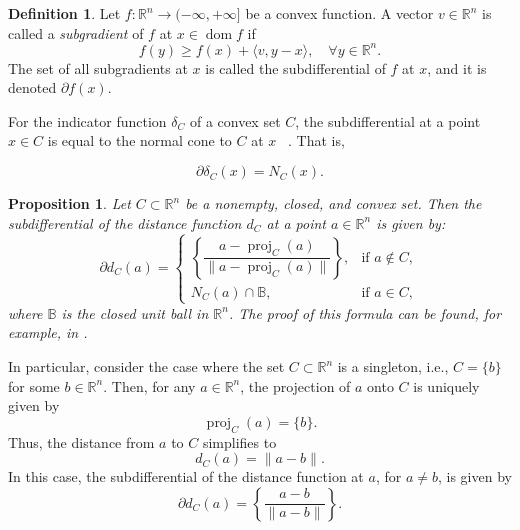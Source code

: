 \documentclass[12pt]{article}
\theoremstyle{plain}
\newtheorem{proposition}[theorem]{Proposition}
\theoremstyle{definition}
\newtheorem{definition}[theorem]{Definition}
\begin{document}
\begin{definition} Let $f : \mathbb{R}^n \to (-\infty, +\infty]$ be a convex function. A vector $v \in \mathbb{R}^n$ is called a \textit{subgradient} of $f$ at $x \in \operatorname{dom} f$ if
	$$
	f(y) \geq f(x) + \langle v, y - x \rangle, \quad \forall y \in \mathbb{R}^n.
	$$
	The set of all subgradients at $x$ is called the subdifferential of $f$ at $x$, and it is denoted $\partial f(x)$.
\end{definition}


For the indicator function \( \delta_C \) of a convex set \( C \), the subdifferential at a point \( x \in C \) is equal to the normal cone to \( C \) at \( x \) ~\cite[Example 3.7, p 85]{MoNa23}. That is,

\begin{equation}
	\partial \delta_C(x) = N_C(x).
	\label{subgradientofindicator}
\end{equation}





\begin{proposition} \label{subgradientformula}
	Let \( C \subset \mathbb{R}^n \) be a nonempty, closed, and convex set. Then the subdifferential of the distance function \( d_C \) at a point \( a \in \mathbb{R}^n \) is given by:
	\[
	\partial d_C(a) = 
	\begin{cases}
		\left\{ \dfrac{a - \operatorname{proj}_C(a)}{\| a - \operatorname{proj}_C(a) \|} \right\}, & \text{if } a \notin C, \\[10pt]
		N_C(a) \cap \mathbb{B}, & \text{if } a \in C,
	\end{cases}
	\]
	where \( \mathbb{B} \) is the closed unit ball in \( \mathbb{R}^n \). The proof of this formula can be found, for example, in \cite[Example 3.3, p.~259]{HiLe96}.
\end{proposition}

\noindent
In particular, consider the case where the set \( C \subset \mathbb{R}^n \) is a singleton, i.e., \( C = \{b\} \) for some \( b \in \mathbb{R}^n \). Then, for any \( a \in \mathbb{R}^n \), the projection of \( a \) onto \( C \) is uniquely given by
\[
\operatorname{proj}_C(a) =\{ b\}.
\]
Thus, the distance from \( a \) to \( C \) simplifies to
\[
d_C(a) = \|a - b\|.
\]
In this case, the subdifferential of the distance function at \( a \), for \( a \neq b \), is given by
\begin{equation} \label{subgradientformula_forsingleton}
	\partial d_C(a) = \left\{ \frac{a - b}{\|a - b\|} \right\}.
\end{equation}
\end{document}
